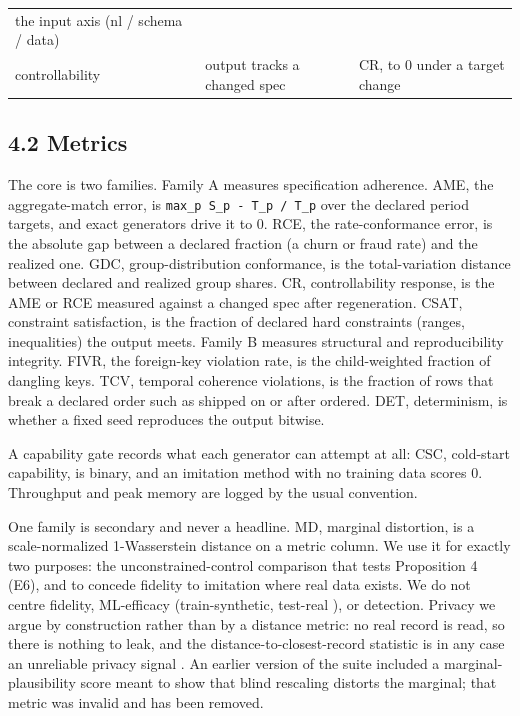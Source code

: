 \begin{longtable}[]{@{}lll@{}}
\begin{minipage}[t]{0.30\columnwidth}
the input axis (nl / schema / data)\strut
\end{minipage}\tabularnewline
\begin{minipage}[t]{0.30\columnwidth}\raggedright
controllability\strut
\end{minipage} & \begin{minipage}[t]{0.30\columnwidth}\raggedright
output tracks a changed spec\strut
\end{minipage} & \begin{minipage}[t]{0.30\columnwidth}\raggedright
CR, to 0 under a target change\strut
\end{minipage}\tabularnewline
\bottomrule
\end{longtable}

\hypertarget{metrics}{%
\subsection{4.2 Metrics}\label{metrics}}

The core is two families. Family A measures specification adherence.
AME, the aggregate-match error, is
\texttt{max\_\allowbreak{}p\ \textbar{}S\_\allowbreak{}p\ -\ T\_\allowbreak{}p\textbar{}\ /\allowbreak{}\ \textbar{}T\_\allowbreak{}p\textbar{}}
over the declared period targets, and exact generators drive it to 0.
RCE, the rate-conformance error, is the absolute gap between a declared
fraction (a churn or fraud rate) and the realized one. GDC,
group-distribution conformance, is the total-variation distance between
declared and realized group shares. CR, controllability response, is the
AME or RCE measured against a changed spec after regeneration. CSAT,
constraint satisfaction, is the fraction of declared hard constraints
(ranges, inequalities) the output meets. Family B measures structural
and reproducibility integrity. FIVR, the foreign-key violation rate, is
the child-weighted fraction of dangling keys. TCV, temporal coherence
violations, is the fraction of rows that break a declared order such as
shipped on or after ordered. DET, determinism, is whether a fixed seed
reproduces the output bitwise.

A capability gate records what each generator can attempt at all: CSC,
cold-start capability, is binary, and an imitation method with no
training data scores 0. Throughput and peak memory are logged by the
usual convention.

One family is secondary and never a headline. MD, marginal distortion,
is a scale-normalized 1-Wasserstein distance on a metric column. We use
it for exactly two purposes: the unconstrained-control comparison that
tests Proposition 4 (E6), and to concede fidelity to imitation where
real data exists. We do not centre fidelity, ML-efficacy
(train-synthetic, test-real \cite{esteban2017tstr}), or detection.
Privacy we argue by construction rather than by a distance metric: no
real record is read, so there is nothing to leak, and the
distance-to-closest-record statistic is in any case an unreliable
privacy signal \cite{dcrdelusion2025}. An earlier version of the suite
included a marginal-plausibility score meant to show that blind
rescaling distorts the marginal; that metric was invalid and has been
removed.

